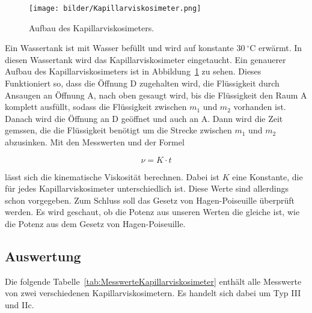             \begin{figure}[h]
                \centering
                \texttt{[image: bilder/Kapillarviskosimeter.png]}
                \caption{Aufbau des Kapillarviskosimeters.}
                \label{fig:Kapillarviskosimeter}
            \end{figure}

            Ein Wassertank ist mit Wasser befüllt und wird auf konstante $30\ \mathrm{^\circ C}$ erwärmt. In diesen Wassertank wird das Kapillarviskosimeter eingetaucht. Ein genauerer Aufbau des Kapillarviskosimeters ist in Abbildung~\ref{fig:Kapillarviskosimeter} zu sehen. Dieses Funktioniert so, dass die Öffnung D zugehalten wird, die Flüssigkeit durch Ansaugen an Öffnung A, nach oben gesaugt wird, bis die Flüssigkeit den Raum A komplett ausfüllt, sodass die Flüssigkeit zwischen $m_1$ und $m_2$ vorhanden ist. Danach wird die Öffnung an D geöffnet und auch an A. Dann wird die Zeit gemssen, die die Flüssigkeit benötigt um die Strecke zwischen $m_{1}$ und $m_{2}$ abzusinken. Mit den Messwerten und der Formel

            \begin{equation}
                \nu = K \cdot t
                \label{eq:kinetamischeViskosität}
            \end{equation}

            lässt sich die kinematische Viskosität berechnen. Dabei ist $K$ eine Konstante, die für jedes Kapillarviskosimeter unterschiedlich ist. Diese Werte sind allerdings schon vorgegeben. Zum Schluss soll das Gesetz von Hagen-Poiseuille überprüft werden. Es wird geschaut, ob die Potenz aus unseren Werten die gleiche ist, wie die Potenz aus dem Gesetz von Hagen-Poiseuille.

        \subsection{Auswertung}

            Die folgende Tabelle~\ref{tab:MesswerteKapillarviskosimeter} enthält alle Messwerte von zwei verschiedenen Kapillarviskosimetern. Es handelt sich dabei um Typ III und IIc.

